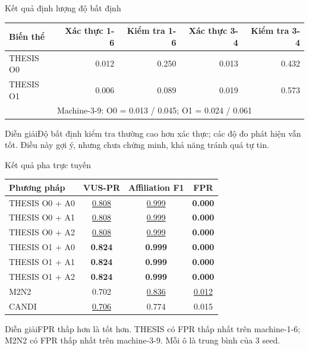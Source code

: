 \documentclass[aspectratio=169]{beamer}
\begin{document}
\begin{frame}{Kết quả định lượng độ bất định}
  \scriptsize
  \begin{tabular}{lrrrr}
    \toprule
    Biến thể & Xác thực 1-6 & Kiểm tra 1-6 & Xác thực 3-4 & Kiểm tra 3-4 \\
    \midrule
    THESIS O0 & 0.012 & 0.250 & 0.013 & 0.432 \\
    THESIS O1 & 0.006 & 0.089 & 0.019 & 0.573 \\
    \midrule
    \multicolumn{5}{c}{Machine-3-9: O0 = 0.013 / 0.045; O1 = 0.024 / 0.061} \\
    \bottomrule
  \end{tabular}
  \begin{exampleblock}{Diễn giải}Độ bất định kiểm tra thường cao hơn xác thực; các độ đo phát hiện vẫn tốt. Điều này gợi ý, nhưng chưa chứng minh, khả năng tránh quá tự tin.\end{exampleblock}
\end{frame}

\begin{frame}{Kết quả pha trực tuyến}
  \scriptsize
  \begin{tabular}{lccc}
    \toprule
    Phương pháp & VUS-PR & Affiliation F1 & FPR \\
    \midrule
    THESIS O0 + A0 & \underline{0.808} & \underline{0.999} & \textbf{0.000} \\
    THESIS O0 + A1 & \underline{0.808} & \underline{0.999} & \textbf{0.000} \\
    THESIS O0 + A2 & \underline{0.808} & \underline{0.999} & \textbf{0.000} \\
    THESIS O1 + A0 & \textbf{0.824} & \textbf{0.999} & \textbf{0.000} \\
    THESIS O1 + A1 & \textbf{0.824} & \textbf{0.999} & \textbf{0.000} \\
    THESIS O1 + A2 & \textbf{0.824} & \textbf{0.999} & \textbf{0.000} \\
    M2N2 & 0.702 & \underline{0.836} & \underline{0.012} \\
    CANDI & \underline{0.706} & 0.774 & 0.015 \\
    \bottomrule
  \end{tabular}
  \begin{exampleblock}{Diễn giải}FPR thấp hơn là tốt hơn. THESIS có FPR thấp nhất trên machine-1-6; M2N2 có FPR thấp nhất trên machine-3-9. Mỗi ô là trung bình của 3 seed.\end{exampleblock}
\end{frame}
\end{document}
